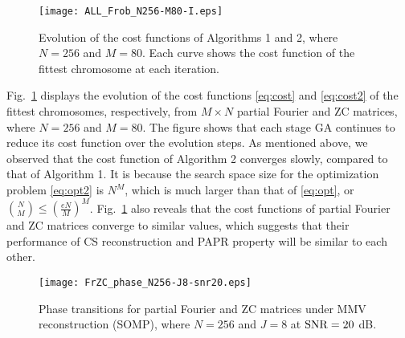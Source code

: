 \documentclass[journal]{IEEEtran}
\newcommand{\Hbu}{{\bf H}}
\newcommand{\Fbu}{{\bf F}}
\newcommand{\Mbu}{{\bf M}}
\newcommand{\Zbu}{{\bf Z}}
\numberwithin{const2}{const}
\begin{document}
\begin{figure}[!t]
	\centering
	\texttt{[image: ALL\_Frob\_N256-M80-I.eps]}
	\caption{Evolution of the cost functions of Algorithms 1 and 2, where $N = 256$ and $M = 80$. 
		Each curve shows the cost function of the fittest chromosome at each iteration.}
	\label{fig:cost_iter}
\end{figure}




Fig.~\ref{fig:cost_iter} displays the evolution of the cost functions \eqref{eq:cost} and \eqref{eq:cost2} of the fittest chromosomes,
respectively, from $M \times N$ partial Fourier and ZC matrices,
where $N=256$ and $M = 80$.
The figure shows that each stage GA continues to reduce its cost function over the evolution steps.
As mentioned above, we observed that 
the cost function of Algorithm 2 %
converges slowly, 
compared to that of Algorithm 1. %
It is because the search space size for the optimization problem \eqref{eq:opt2} is $N^M$,
which is much larger than that of \eqref{eq:opt}, or $\binom{N}{M} \leq \left( \frac{eN}{M} \right)^M$.
Fig.~\ref{fig:cost_iter} also reveals that the cost functions of partial Fourier and ZC matrices
converge to similar values,
which suggests that %
their performance of CS reconstruction and PAPR property will be similar to each other.


\begin{figure}[!h]
	\centering
	\texttt{[image: FrZC\_phase\_N256-J8-snr20.eps]}
	\caption{Phase transitions for partial Fourier %
		and ZC %
		matrices under MMV reconstruction (SOMP), %
		where $N=256$ and $J=8$ at ${\rm SNR}= 20$ dB.}
	\label{fig:all_mmv}
\end{figure}
\end{document}
